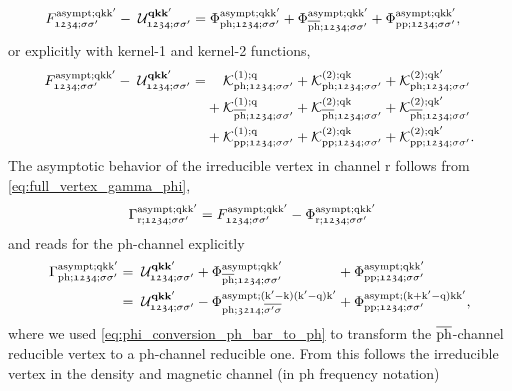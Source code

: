 \documentclass[../../main.tex]{subfiles}
\begin{document}
\begin{align}
\begin{split}
	F_{\mathfrak{1234};\sigma\sigma'}^{\text{asympt};\text{q}\text{k}\text{k}'}-\;\mathcal{U}^{\textbf{qkk}'}_{\mathfrak{1234};\sigma\sigma'}&=\Phi_{\text{ph};\mathfrak{1234};\sigma\sigma'}^{\text{asympt};\text{q}\text{k}\text{k}'}+\Phi_{\overline{\text{ph}};\mathfrak{1234};\sigma\sigma'}^{\text{asympt};\text{q}\text{k}\text{k}'}+\Phi_{\text{pp};\mathfrak{1234};\sigma\sigma'}^{\text{asympt};\text{q}\text{k}\text{k}'},
\end{split}
\end{align}
or explicitly with kernel-1 and kernel-2 functions,
\begin{equation}
\begin{alignedat}{4}
	F_{\mathfrak{1234};\sigma\sigma'}^{\text{asympt};\text{q}\text{k}\text{k}'}-\;\mathcal{U}^{\textbf{qkk}'}_{\mathfrak{1234};\sigma\sigma'}=&\phantom{+}\;\,\mathcal{K}^{(1);\text{q}}_{\text{ph};\mathfrak{1234};\sigma\sigma'} &&+ \mathcal{K}^{(2);\text{q}\text{k}}_{\text{ph};\mathfrak{1234};\sigma\sigma'}&&+\mathcal{K}^{(2);\text{q}\text{k}'}_{\text{ph};\mathfrak{1234};\sigma\sigma'}\\
	&+\mathcal{K}^{(1);\text{q}}_{\overline{\text{ph}};\mathfrak{1234};\sigma\sigma'} &&+ \mathcal{K}^{(2);\text{q}\text{k}}_{\overline{\text{ph}};\mathfrak{1234};\sigma\sigma'}&&+\mathcal{K}^{(2);\text{q}\text{k}'}_{\overline{\text{ph}};\mathfrak{1234};\sigma\sigma'}\\
	&+\mathcal{K}^{(1);\text{q}}_{\text{pp};\mathfrak{1234};\sigma\sigma'} &&+ \mathcal{K}^{(2);\text{q}\text{k}}_{\text{pp};\mathfrak{1234};\sigma\sigma'}&&+\mathcal{K}^{(2);\text{q}\text{k}'}_{\text{pp};\mathfrak{1234};\sigma\sigma'}.
\end{alignedat}
\end{equation}
The asymptotic behavior of the irreducible vertex in channel r follows from \eqref{eq:full_vertex_gamma_phi},
\begin{align}
	\Gamma_{\text{r};\mathfrak{1234};\sigma\sigma'}^{\text{asympt};\text{q}\text{k}\text{k}'}&=F_{\mathfrak{1234};\sigma\sigma'}^{\text{asympt};\text{q}\text{k}\text{k}'}-\Phi_{\text{r};\mathfrak{1234};\sigma\sigma'}^{\text{asympt};\text{q}\text{k}\text{k}'}
\end{align}
and reads for the ph-channel explicitly
\begin{equation}
\begin{alignedat}{3}
	\Gamma_{\text{ph};\mathfrak{1234};\sigma\sigma'}^{\text{asympt};\text{q}\text{k}\text{k}'}&=\;\mathcal{U}^{\textbf{qkk}'}_{\mathfrak{1234};\sigma\sigma'}&&+\Phi_{\overline{\text{ph}};\mathfrak{1234};\sigma\sigma'}^{\text{asympt};\text{q}\text{k}\text{k}'}&&+\Phi_{\text{pp};\mathfrak{1234};\sigma\sigma'}^{\text{asympt};\text{q}\text{k}\text{k}'}\\
	&=\;\mathcal{U}^{\textbf{qkk}'}_{\mathfrak{1234};\sigma\sigma'}&&-\Phi_{\text{ph};\mathfrak{3214};\overline{\sigma'\sigma}}^{\text{asympt};(\text{k}'-\text{k})(\text{k}'-\text{q})\text{k}'}&&+\Phi_{\text{pp};\mathfrak{1234};\sigma\sigma'}^{\text{asympt};(\text{k}+\text{k}'-\text{q})\text{k}\text{k}'},
\end{alignedat}
\end{equation}
where we used \eqref{eq:phi_conversion_ph_bar_to_ph} to transform the $\overline{\text{ph}}$-channel reducible vertex to a ph-channel reducible one. From this follows the irreducible vertex in the density and magnetic channel (in ph frequency notation) \cite{efficient BSE}
\end{document}
